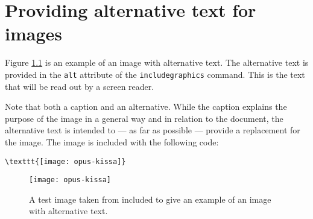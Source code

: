 \documentclass[utf8,english,accessibility]{gradu3}
\begin{document}
\chapter{Providing alternative text for images}

Figure \ref{fig:opus-kissa} is an example of an image with alternative text. The alternative text is provided in the \texttt{alt} attribute of the \texttt{includegraphics} command. This is the text that will be read out by a screen reader.

Note that both a caption and an alternative. While the caption explains the purpose of the image in a general way and in relation to the document, the alternative text is intended to --- as far as possible --- provide a replacement for the image. The image is included with the following code:

\begingroup\footnotesize
\begin{verbatim}
\texttt{[image: opus-kissa]}
\end{verbatim}
\endgroup

\begin{figure}[ht]\centering
\texttt{[image: opus-kissa]}
  \caption{A test image taken from \textcite{kaijanaho03:_latex_ams_latex} included to give an example of an image with alternative text.}
  \label{fig:opus-kissa}
\end{figure}

\printbibliography
\end{document}
